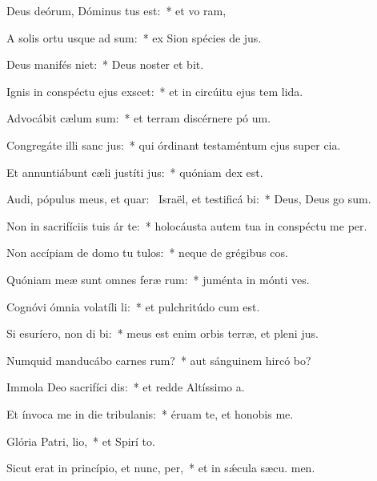 \item Deus deórum, Dóminus tus est:~* et vo ram,
\item A solis ortu usque ad sum:~* ex Sion spécies de jus.
\item Deus manifés niet:~* Deus noster et  bit.
\item Ignis in conspéctu ejus exscet:~* et in circúitu ejus tem lida.
\item Advocábit cælum sum:~* et terram discérnere pó um.
\item Congregáte illi sanc jus:~* qui órdinant testaméntum ejus super cia.
\item Et annuntiábunt cæli justíti jus:~* quóniam  dex est.
\item Audi, pópulus meus, et quar:~\pscross{} Israël, et testificá bi:~* Deus, Deus  go sum.
\item Non in sacrifíciis tuis ár te:~* holocáusta autem tua in conspéctu me  per.
\item Non accípiam de domo tu tulos:~* neque de grégibus  cos.
\item Quóniam meæ sunt omnes feræ rum:~* juménta in mónti  ves.
\item Cognóvi ómnia volatíli li:~* et pulchritúdo  cum est.
\item Si esuríero, non di bi:~* meus est enim orbis terræ, et pleni jus.
\item Numquid manducábo carnes rum?~* aut sánguinem hircó bo?
\item Immola Deo sacrifíci dis:~* et redde Altíssimo  a.
\item Et ínvoca me in die tribulanis:~* éruam te, et honobis me.
\item Glória Patri,  lio,~* et Spirí to.
\item Sicut erat in princípio, et nunc,  per,~* et in sǽcula sæcu. men.
